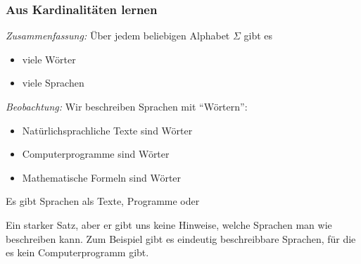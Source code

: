 \documentclass[aspectratio=1610,onlymath]{beamer}
\begin{document}
\begin{frame}\frametitle{Aus Kardinalitäten lernen}

\emph{Zusammenfassung:} Über jedem beliebigen Alphabet $\Sigma$ gibt es
\begin{itemize}
\item {} viele Wörter
\item {} viele Sprachen
\end{itemize}
\bigskip\pause

\emph{Beobachtung:} Wir beschreiben Sprachen mit "`Wörtern"':
\begin{itemize}
\item Natürlichsprachliche Texte sind Wörter
\item Computerprogramme sind Wörter
\item Mathematische Formeln sind Wörter
\end{itemize}
Es gibt  Sprachen als Texte, Programme oder 
\pause
\bigskip


Ein starker Satz, aber er gibt uns keine Hinweise, welche Sprachen man wie beschreiben kann.
Zum Beispiel gibt es eindeutig beschreibbare Sprachen, für die es kein Computerprogramm gibt.

\end{frame}



\end{document}
